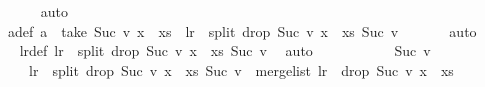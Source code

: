 \begin{isabellebody}
\ \ \ \ \isamarkupfalse%
\ auto\isanewline
\ \ \isamarkupfalse%
\ \isamarkupfalse%
\ a{\isacharunderscore}{\kern0pt}def{\isacharcolon}{\kern0pt}\ {\isachardoublequoteopen}a\ {\isacharequal}{\kern0pt}\ {\isacharparenleft}{\kern0pt}take\ {\isacharparenleft}{\kern0pt}Suc\ v{\isacharparenright}{\kern0pt}\ {\isacharparenleft}{\kern0pt}x\ {\isacharhash}{\kern0pt}\ xs{\isacharparenright}{\kern0pt}{\isacharparenright}{\kern0pt}\ {\isasymand}\ l{\isacharunderscore}{\kern0pt}r\ {\isacharequal}{\kern0pt}\ {\isacharparenleft}{\kern0pt}split\ {\isacharparenleft}{\kern0pt}drop\ {\isacharparenleft}{\kern0pt}Suc\ v{\isacharparenright}{\kern0pt}\ {\isacharparenleft}{\kern0pt}x\ {\isacharhash}{\kern0pt}\ xs{\isacharparenright}{\kern0pt}{\isacharparenright}{\kern0pt}\ {\isacharparenleft}{\kern0pt}Suc\ v{\isacharparenright}{\kern0pt}{\isacharparenright}{\kern0pt}{\isachardoublequoteclose}\ \isanewline
\ \ \ \ \isamarkupfalse%
\ auto\ \isanewline
\ \ \isamarkupfalse%
\ \isamarkupfalse%
\ l{\isacharunderscore}{\kern0pt}r{\isacharunderscore}{\kern0pt}def{\isacharcolon}{\kern0pt}\ {\isachardoublequoteopen}l{\isacharunderscore}{\kern0pt}r\ {\isacharequal}{\kern0pt}\ {\isacharparenleft}{\kern0pt}split\ {\isacharparenleft}{\kern0pt}drop\ {\isacharparenleft}{\kern0pt}Suc\ v{\isacharparenright}{\kern0pt}\ {\isacharparenleft}{\kern0pt}x\ {\isacharhash}{\kern0pt}\ xs{\isacharparenright}{\kern0pt}{\isacharparenright}{\kern0pt}\ {\isacharparenleft}{\kern0pt}Suc\ v{\isacharparenright}{\kern0pt}{\isacharparenright}{\kern0pt}{\isachardoublequoteclose}\ \isamarkupfalse%
\ auto\isanewline
\ \ \isanewline
\ \ \isamarkupfalse%
\ {}\ \isamarkupfalse%
\ {\isachardoublequoteopen}{}\ {\isacharless}{\kern0pt}\ Suc\ v\ {\isasymLongrightarrow}\isanewline
\ \ \ \ l{\isacharunderscore}{\kern0pt}r\ {\isacharequal}{\kern0pt}\ split\ {\isacharparenleft}{\kern0pt}drop\ {\isacharparenleft}{\kern0pt}Suc\ v{\isacharparenright}{\kern0pt}\ {\isacharparenleft}{\kern0pt}x\ {\isacharhash}{\kern0pt}\ xs{\isacharparenright}{\kern0pt}{\isacharparenright}{\kern0pt}\ {\isacharparenleft}{\kern0pt}Suc\ v{\isacharparenright}{\kern0pt}\ {\isasymLongrightarrow}\ merge{\isacharunderscore}{\kern0pt}list\ l{\isacharunderscore}{\kern0pt}r\ {\isacharequal}{\kern0pt}\ drop\ {\isacharparenleft}{\kern0pt}Suc\ v{\isacharparenright}{\kern0pt}\ {\isacharparenleft}{\kern0pt}x\ {\isacharhash}{\kern0pt}\ xs{\isacharparenright}{\kern0pt}{\isachardoublequoteclose}\isanewline

\end{isabellebody}
